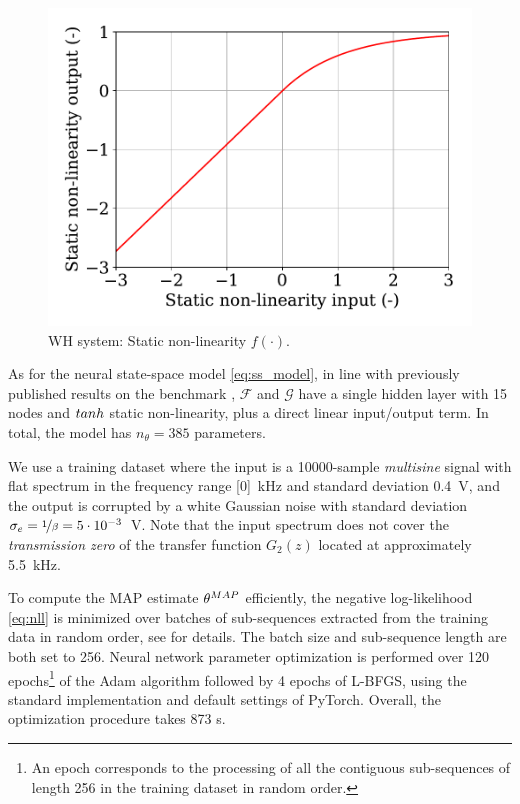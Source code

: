 \documentclass{ifacconf}
\newcommand{\MAP}{{\rm MAP}}
\begin{document}
\begin{figure}
 \centering
 \includegraphics[width=.7\linewidth]{img/wh_static.pdf}
 \caption{WH system: Static non-linearity $f(\cdot)$.}
 \label{fig:wh_static}
\end{figure}

As for the neural state-space model \eqref{eq:ss_model}, in line with previously published results on the benchmark \citep{beintema2021nonlinear}, $\mathcal{F}$ and $\mathcal{G}$ have a single hidden layer with 15 nodes and $\rm tanh$ static non-linearity, plus a direct linear input/output term. In total, the model has $n_\theta=385$ parameters.

We use a training dataset where the input is a 10000-sample \emph{multisine} signal with flat spectrum 
in the frequency range [0]~kHz and standard deviation 0.4~V, and the output is corrupted by a white Gaussian noise with standard deviation $\sigma_e=\nicefrac{1}{\beta}=5 \cdot 10^{-3}$~V. Note that the input spectrum does not cover the \emph{transmission zero} of the transfer function $G_2(z)$ located at approximately 5.5~kHz.

To compute the MAP estimate $\theta^\MAP$ efficiently, the negative log-likelihood \eqref{eq:nll} is minimized over batches of sub-sequences extracted from the training data in random order, see \citet{forgione2020model} for details. The batch size and sub-sequence length are both set to 256. 
Neural network parameter optimization is performed over 120 epochs\footnote{An epoch corresponds to the processing of all the contiguous sub-sequences of length 256 in the training dataset in random order.} of the Adam algorithm followed by 4 epochs of L-BFGS, using the standard implementation and default settings of PyTorch. Overall, the optimization procedure takes 873 s.
\end{document}

